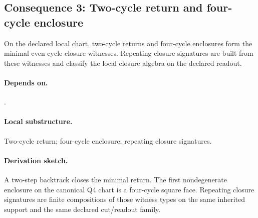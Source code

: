 \subsection{Consequence 3: Two-cycle return and four-cycle enclosure}
\begin{consequence}\label{cons:c3}
On the declared local chart, two-cycle returns and four-cycle enclosures form the minimal even-cycle closure witnesses. Repeating closure signatures are built from these witnesses and classify the local closure algebra on the declared readout.
\end{consequence}
\paragraph{Depends on.} .
\paragraph{Local substructure.} Two-cycle return; four-cycle enclosure; repeating closure signatures.
\paragraph{Derivation sketch.} A two-step backtrack closes the minimal return. The first nondegenerate enclosure on the canonical Q4 chart is a four-cycle square face. Repeating closure signatures are finite compositions of those witness types on the same inherited support and the same declared cut/readout family.
